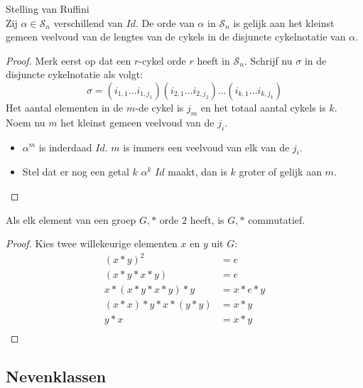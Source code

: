 \documentclass[main.tex]{subfiles}
\begin{document}
\begin{st}
  \label{st:stelling-van-ruffini}
  Stelling van Ruffini\\
  Zij $\alpha\in \mathcal{S}_{n}$ verschillend van $Id$. De orde van $\alpha$ in $\mathcal{S}_{n}$ is gelijk aan het kleinst gemeen veelvoud van de lengtes van de cykels in de disjuncte cykelnotatie van $\alpha$.

  \begin{proof}
    Merk eerst op dat een $r$-cykel orde $r$ heeft in $\mathcal{S}_{n}$.
    Schrijf nu $\sigma$ in de disjuncte cykelnotatie als volgt:
    \[ \sigma = (i_{1,1}\dotsc i_{1,j_{1}})(i_{2,1}\dotsc i_{2,j_{2}}) \dotsc (i_{k,1}\dotsc i_{k,j_{k}}) \]
    Het aantal elementen in de $m$-de cykel is $j_{m}$ en het totaal aantal cykels is $k$.
    Noem nu $m$ het kleinst gemeen veelvoud van de $j_{i}$.
    \begin{itemize}
    \item $\alpha^{m}$ is inderdaad $Id$.
      $m$ is immers een veelvoud van elk van de $j_{i}$.
    \item Stel dat er nog een getal $k$ $\alpha^{k}$ $Id$ maakt, dan is $k$ groter of gelijk aan $m$.
    \end{itemize}
  \end{proof}
\end{st}

\begin{st}
  \label{st:groep-alles-orde-2-commutatief}
  Als elk element van een groep $G,*$ orde $2$ heeft, is $G,*$ commutatief.

  \begin{proof}
    Kies twee willekeurige elementen $x$ en $y$ uit $G$:
    \[ 
    \begin{array}{rl}
      (x*y)^{2} &= e\\
      (x*y*x*y) &= e\\
      x*(x*y*x*y)*y &= x*e*y\\
      (x*x)*y*x*(y*y) &= x*y\\
      y*x &= x*y\\
    \end{array}
    \]
  \end{proof}
\end{st}

\subsection{Nevenklassen}
\label{sec:nevenklassen}
\end{document}
